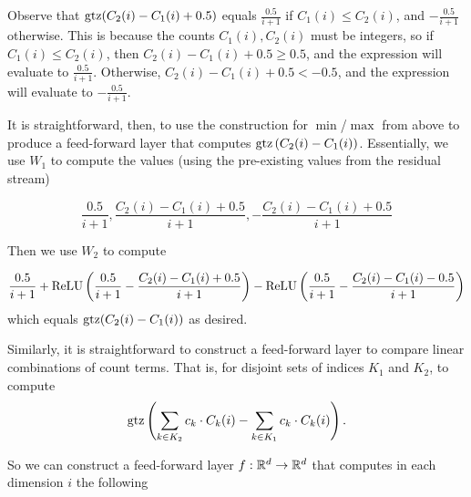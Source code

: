 Observe that $\operatorname{gtz}(C_2(i)-C_1(i)+0.5)$ equals $\frac{0.5}{i+1}$ if $C_1(i)\leq C_2(i)$, and $-\frac{0.5}{i+1}$ otherwise.
This is because the counts $C_1(i),C_2(i)$ must be integers, so if $C_1(i)\leq C_2(i)$, then $C_2(i)-C_1(i)+0.5\geq 0.5$, and the expression will evaluate to $\frac{0.5}{i+1}$. Otherwise, $C_2(i)-C_1(i)+0.5<-0.5$, and the expression will evaluate to $-\frac{0.5}{i+1}$.

It is straightforward, then, to use the construction for $\min$/$\max$ from above to produce a feed-forward layer that computes $\operatorname{gtz}\left(C_2(i)-C_1(i)\right)$. Essentially, we use $W_1$ to compute the values (using the pre-existing values from the residual stream)

\[\frac{0.5}{i+1}, \frac{C_2(i)-C_1(i)+0.5}{i+1}, -\frac{C_2(i)-C_1(i)+0.5}{i+1}\]

Then we use $W_2$ to compute

\[\frac{0.5}{i+1}+\text{ReLU}\left(\frac{0.5}{i+1}-\frac{C_2(i)-C_1(i)+0.5}{i+1}\right)-\text{ReLU}\left(\frac{0.5}{i+1}-\frac{C_2(i)-C_1(i)-0.5}{i+1}\right)\]
which equals $\operatorname{gtz}(C_2(i)-C_1(i))$ as desired.

Similarly, it is straightforward to construct a feed-forward layer to compare linear combinations of count terms. That is, for disjoint sets of indices $K_1$ and $K_2$, to compute
\[\operatorname{gtz}\left(\sum_{k\in K_2} c_{k} \cdot C_k(i) -\sum_{k\in K_1} c_{k} \cdot C_k(i)\right).\]

So we can construct a feed-forward layer $f:\mathbb{R}^d\to\mathbb{R}^d$ that computes in each dimension $i$ the following

